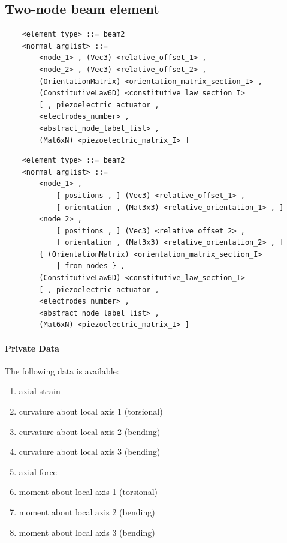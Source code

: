 \subsection{Two-node beam element}
\begin{verbatim}
    <element_type> ::= beam2
    <normal_arglist> ::=
        <node_1> , (Vec3) <relative_offset_1> ,
        <node_2> , (Vec3) <relative_offset_2> ,
        (OrientationMatrix) <orientation_matrix_section_I> ,
        (ConstitutiveLaw6D) <constitutive_law_section_I>
        [ , piezoelectric actuator , 
        <electrodes_number> ,
        <abstract_node_label_list> ,
        (Mat6xN) <piezoelectric_matrix_I> ]
\end{verbatim}
\begin{verbatim}
    <element_type> ::= beam2
    <normal_arglist> ::=
        <node_1> ,
            [ positions , ] (Vec3) <relative_offset_1> ,
            [ orientation , (Mat3x3) <relative_orientation_1> , ]
        <node_2> ,
            [ positions , ] (Vec3) <relative_offset_2> ,
            [ orientation , (Mat3x3) <relative_orientation_2> , ]
        { (OrientationMatrix) <orientation_matrix_section_I>
            | from nodes } ,
        (ConstitutiveLaw6D) <constitutive_law_section_I>
        [ , piezoelectric actuator , 
        <electrodes_number> ,
        <abstract_node_label_list> ,
        (Mat6xN) <piezoelectric_matrix_I> ]
\end{verbatim}

\paragraph{Private Data}
The following data is available:
\begin{enumerate}
\item {} axial strain
\setcounter{enumi}{3}
\item {} curvature about local axis 1 (torsional)
\item {} curvature about local axis 2 (bending)
\item {} curvature about local axis 3 (bending)
\item {} axial force
\setcounter{enumi}{9}
\item {} moment about local axis 1 (torsional)
\item {} moment about local axis 2 (bending)
\item {} moment about local axis 3 (bending)
\end{enumerate}




